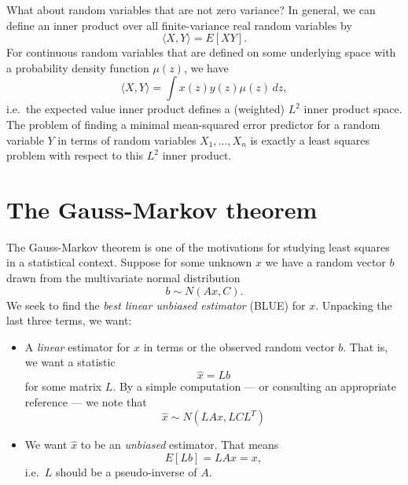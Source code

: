 \documentclass[12pt, leqno]{article} %
\begin{document}
What about random variables that are not zero variance?  In general,
we can define an inner product over all finite-variance real random
variables by
\[
  \langle X, Y \rangle = E[XY].
\]
For continuous random variables that are defined on some underlying
space with a probability density function $\mu(z)$, we have
\[
  \langle X, Y \rangle = \int x(z) y(z) \mu(z) \, dz,
\]
i.e.~the expected value inner product defines a (weighted) $L^2$
inner product space.  The problem of finding a minimal
mean-squared error predictor for a random variable $Y$ in terms of
random variables $X_1, \ldots, X_n$ is exactly a least squares
problem with respect to this $L^2$ inner product.

\section{The Gauss-Markov theorem}

The Gauss-Markov theorem is one of the motivations for studying least
squares in a statistical context.  Suppose for some unknown $x$ we
have a random vector $b$ drawn from the multivariate normal
distribution
\[
  b \sim N(Ax, C).
\]
We seek to find the {\em best linear unbiased estimator} (BLUE) for
$x$.  Unpacking the last three terms, we want:
\begin{itemize}
\item A {\em linear} estimator for $x$ in terms or the observed random
  vector $b$.  That is, we want a statistic
  \[
    \hat{x} = Lb
  \]
  for some matrix $L$.  By a simple computation --- or consulting an
  appropriate reference --- we note that
  \[
    \hat{x} \sim N(LAx, LCL^T)
  \]
\item We want $\hat{x}$ to be an {\em unbiased} estimator.  That means
  \[
    E[Lb] = LAx = x,
  \]
  i.e.~$L$ should be a pseudo-inverse of $A$.  
\end{itemize}
\end{document}
